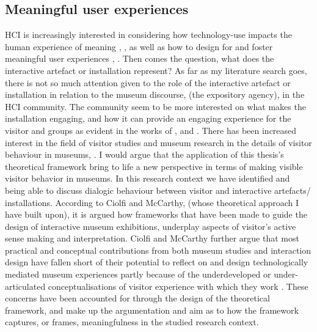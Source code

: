 \subsection{Meaningful user experiences}
HCI is increasingly interested in considering how technology-use impacts the human experience of meaning \autocite{kaptelinin_technology_2018}, \autocite{light_design_2017}, as well as how to design for and foster meaningful user experiences \autocite{grosse-hering_slow_2013}, \autocite{Hassenzahl_Moments_2013}. Then comes the question, what does the interactive artefact or installation represent? As far as my literature search goes, there is not so much attention given to the role of the interactive artefact or installation in relation to the museum discourse, (the expository agency), in the HCI community. The community seem to be more interested on what makes the installation engaging, and how it can provide an engaging experience for the visitor and groups as evident in the works of \autocite{hornecker_learning_2006}, and \autocite{ciolfi_designing_2012}. There has been increased interest in the field of visitor studies and museum research in the details of visitor behaviour in museums, \autocite{hornecker_to-and-fro_2016}. I would argue that the application of this thesis's theoretical framework bring to life a new perspective in terms of making visible visitor behavior in museums. In this research context we have identified and being able to discuss dialogic behaviour between visitor and interactive artefacts/ installations. According to Ciolfi and McCarthy, (whose theoretical approach I have built upon), it is argued how frameworks that have been made to guide the design of interactive museum exhibitions, underplay aspects of visitor’s active sense making and interpretation. Ciolfi and McCarthy further argue that most practical and conceptual contributions from both museum studies and interaction design have fallen short of their potential to reflect on and design technologically mediated museum experiences partly because of the underdeveloped or under-articulated conceptualisations of visitor experience with which they work \autocite[p. 248]{mccarthy_place}. These concerns have been accounted for through the design of the theoretical framework, and make up the argumentation and aim as to how the framework captures, or frames, meaningfulness in the studied research context.

